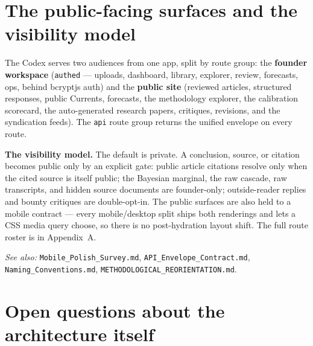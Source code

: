 \documentclass[11pt]{article}
\begin{document}
\section{The public-facing surfaces and the visibility model}

The Codex serves two audiences from one app, split by route group: the
\textbf{founder workspace} (\texttt{authed} --- uploads, dashboard, library,
explorer, review, forecasts, ops, behind bcryptjs auth) and the
\textbf{public site} (reviewed articles, structured responses, public
Currents, forecasts, the methodology explorer, the calibration scorecard, the
auto-generated research papers, critiques, revisions, and the syndication
feeds). The \texttt{api} route group returns the unified envelope on every
route.

\textbf{The visibility model.} The default is private. A conclusion, source,
or citation becomes public only by an explicit gate: public article citations
resolve only when the cited source is itself public; the Bayesian marginal,
the raw cascade, raw transcripts, and hidden source documents are
founder-only; outside-reader replies and bounty critiques are double-opt-in.
The public surfaces are also held to a mobile contract --- every
mobile/desktop split ships both renderings and lets a CSS media query choose,
so there is no post-hydration layout shift. The full route roster is in
Appendix~A.

\textit{See also:} \texttt{Mobile\_Polish\_Survey.md},
\texttt{API\_Envelope\_Contract.md}, \texttt{Naming\_Conventions.md},
\texttt{METHODOLOGICAL\_REORIENTATION.md}.

\section{Open questions about the architecture itself}
\end{document}
